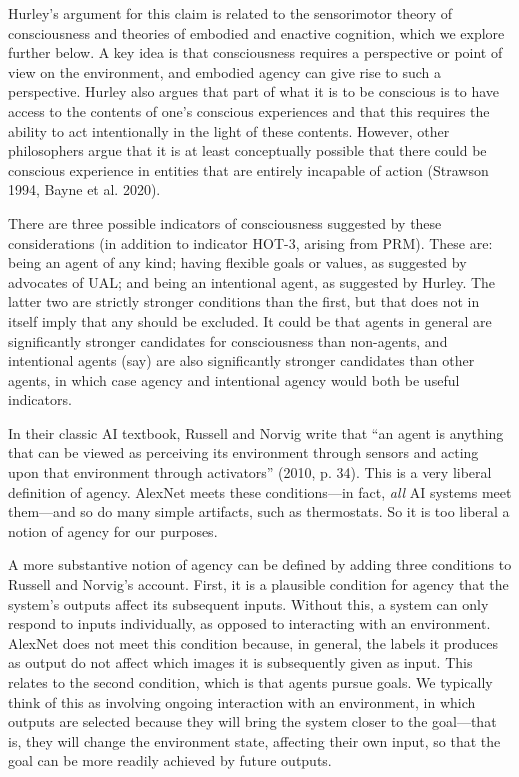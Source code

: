 \documentclass[12pt]{article}
\begin{document}
Hurley’s argument for this claim is related to the sensorimotor theory of consciousness and theories of embodied and enactive cognition, which we explore further below. A key idea is that consciousness requires a perspective or point of view on the environment, and embodied agency can give rise to such a perspective. Hurley also argues that part of what it is to be conscious is to have access to the contents of one’s conscious experiences and that this requires the ability to act intentionally in the light of these contents. However, other philosophers argue that it is at least conceptually possible that there could be conscious experience in entities that are entirely incapable of action (Strawson 1994, Bayne et al. 2020).

There are three possible indicators of consciousness suggested by these considerations (in addition to indicator HOT-3, arising from PRM). These are: being an agent of any kind; having flexible goals or values, as suggested by advocates of UAL; and being an intentional agent, as suggested by Hurley. The latter two are strictly stronger conditions than the first, but that does not in itself imply that any should be excluded. It could be that agents in general are significantly stronger candidates for consciousness than non-agents, and intentional agents (say) are also significantly stronger candidates than other agents, in which case agency and intentional agency would both be useful indicators.

In their classic AI textbook, Russell and Norvig write that ``an agent is anything that can be viewed as perceiving its environment through sensors and acting upon that environment through activators'' (2010, p. 34). This is a very liberal definition of agency. AlexNet meets these conditions—in fact, \textit{all} AI systems meet them—and so do many simple artifacts, such as thermostats. So it is too liberal a notion of agency for our purposes. 

A more substantive notion of agency can be defined by adding three conditions to Russell and Norvig’s account. First, it is a plausible condition for agency that the system’s outputs affect its subsequent inputs. Without this, a system can only respond to inputs individually, as opposed to interacting with an environment. AlexNet does not meet this condition because, in general, the labels it produces as output do not affect which images it is subsequently given as input. This relates to the second condition, which is that agents pursue goals. We typically think of this as involving ongoing interaction with an environment, in which outputs are selected because they will bring the system closer to the goal—that is, they will change the environment state, affecting their own input, so that the goal can be more readily achieved by future outputs.
\end{document}
